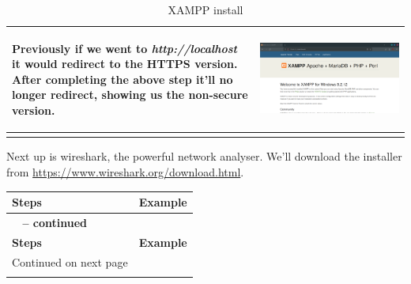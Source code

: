 \documentclass[11pt,a4paper]{report}
\begin{document}
\begin{flushleft}
\begin{center}
\begin{longtable}{ m{5cm} l }
                        \begin{flushleft}
                            Previously if we went to \textit{http://localhost} it would redirect to the HTTPS version. After completing the above step it'll no longer redirect, showing us the non-secure version.
                        \end{flushleft}
                        & \includegraphics[scale=0.285,valign=c]{phase1/images/install_xampp17} \\
                        \hline

                        \caption{XAMPP install} \label{tab:xampp}
                    \end{longtable}
                \end{center}

            Next up is wireshark, the powerful network analyser. We'll download the installer from \href{https://www.wireshark.org/download.html}{https://www.wireshark.org/download.html}.
                \begin{center}
                    \begin{longtable}{ m{5cm} l }
                        \textbf{Steps} & \textbf{Example} \\
                        \hline
                        \endfirsthead
                        {{\bfseries \tablename\ \thetable{} -- continued}} \\
                        \textbf{Steps} & \textbf{Example} \\
                        \hline
                        \endhead
                        \hline Continued on next page \\
                        \endfoot
                        \endlastfoot


\end{longtable}
\end{center}
\end{flushleft}
\end{document}
